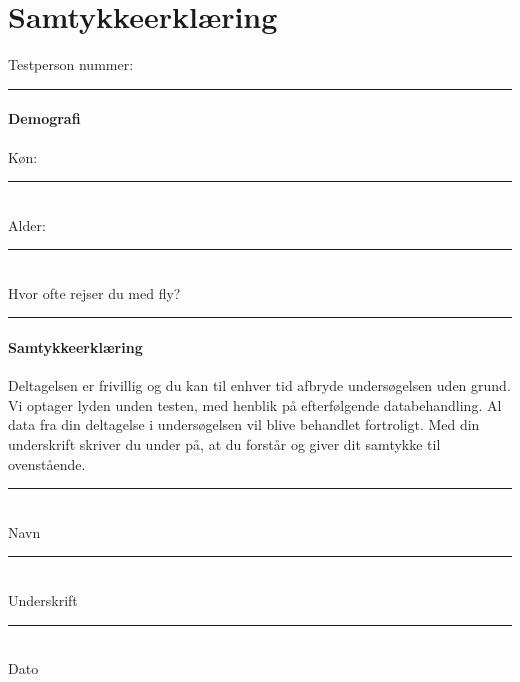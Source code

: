 \chapter{Samtykkeerklæring}
\label{ParametreSamtykkeerklaering}
%
Testperson nummer:\rule{2cm}{0.4pt}
%
\subsubsection*{Demografi}
%
Køn:\rule{2cm}{0.4pt}\\
Alder:\rule{2cm}{0.4pt}\\
Hvor ofte rejser du med fly? \rule{10cm}{0.4pt} 


\subsubsection*{Samtykkeerklæring}
%
Deltagelsen er frivillig og du kan til enhver tid afbryde undersøgelsen uden grund. Vi optager lyden unden testen, med henblik på efterfølgende databehandling. Al data fra din deltagelse i undersøgelsen vil blive behandlet fortroligt. \blankline
%
Med din underskrift skriver du under på, at du forstår og giver dit samtykke til ovenstående.\blankline
%
\rule{10cm}{0.4pt}\\
Navn\blankline
%
\rule{10cm}{0.4pt}\\
Underskrift\blankline
%
\rule{4cm}{0.4pt}\\
Dato


